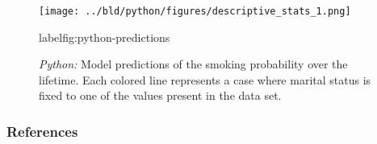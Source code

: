 \documentclass[11pt, aspectratio=169]{beamer}
\begin{document}
\begin{frame}[t]
    \begin{figure}[H]

        \centering
        \texttt{[image: ../bld/python/figures/descriptive\_stats\_1.png]}

        \caption{\emph{Python:} Model predictions of the smoking probability over the
            lifetime. Each colored line represents a case where marital status is fixed to
            one of the values present in the data set.}
label{fig:python-predictions}

    \end{figure}
\end{frame}






 {
    \begin{frame}
        \frametitle{}
    \end{frame}

}

\begin{frame}[allowframebreaks]
    \frametitle{References}
    \renewcommand{\bibfont}{\normalfont\footnotesize}
    \printbibliography
\end{frame}
\end{document}
